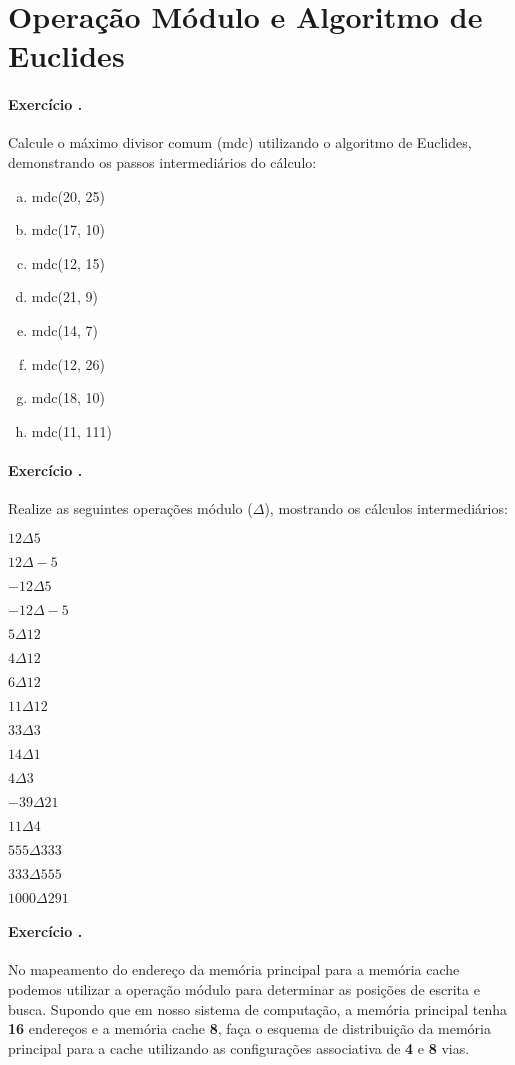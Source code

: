 \setcounter{exno}{0}
\def\exerc{\paragraph{Exercício \arabic{exno}.}
  \addtocounter{exno}{1}}


\section*{Operação Módulo e Algoritmo de Euclides}

\exerc{} Calcule o máximo divisor comum (mdc) utilizando o algoritmo
de Euclides, demonstrando os passos intermediários do cálculo:

\begin{enumerate}[(a)]
\item mdc(20, 25)
\item mdc(17, 10)
\item mdc(12, 15)
\item mdc(21, 9)
\item mdc(14, 7)
\item mdc(12, 26)
\item mdc(18, 10)
\item mdc(11, 111)
\end{enumerate}

\def\modsym{\Delta} \def\mod#1#2{$#1\modsym#2$} \exerc{} Realize as
seguintes operações módulo ($\modsym$), mostrando os cálculos 
intermediários:

\begin{enumerate}[(a)]
\begin{minipage}{.5\textwidth}
\item \mod{12}{5}
\item \mod{12}{-5}
\item \mod{-12}{5}
\item \mod{-12}{-5}
\item \mod{5}{12}
\item \mod{4}{12}
\item \mod{6}{12}
\item \mod{11}{12}
\end{minipage}
\begin{minipage}{.5\textwidth}
\item \mod{33}{3}
\item \mod{14}{1}
\item \mod{4}{3}
\item \mod{-39}{21}
\item \mod{11}{4}
\item \mod{555}{333}
\item \mod{333}{555}
\item \mod{1000}{291}
\end{minipage}
\end{enumerate}

\exerc{} No mapeamento do endereço da memória principal para a memória
cache podemos utilizar a operação módulo para determinar as posições
de escrita e busca. Supondo que em nosso sistema de computação, a
memória principal tenha {\bf 16} endereços e a memória cache {\bf 8},
faça o esquema de distribuição da memória principal para a cache
utilizando as configurações associativa de {\bf 4} e {\bf 8} vias.


